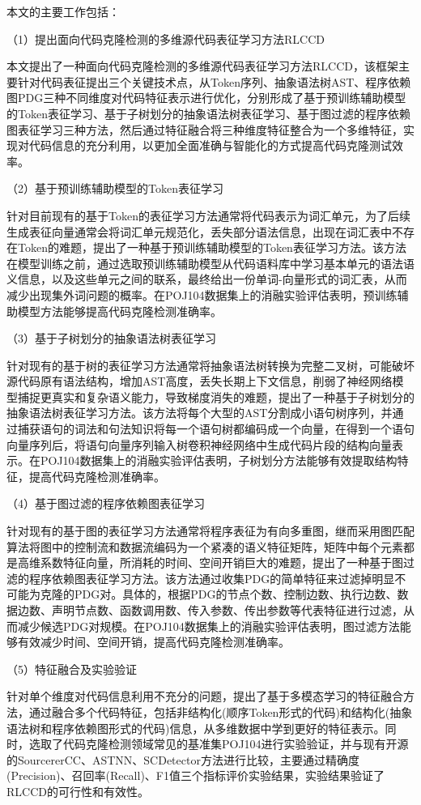 本文的主要工作包括：

（1）提出面向代码克隆检测的多维源代码表征学习方法RLCCD 

本文提出了一种面向代码克隆检测的多维源代码表征学习方法RLCCD，该框架主要针对代码表征提出三个关键技术点，从Token序列、抽象语法树AST、程序依赖图PDG三种不同维度对代码特征表示进行优化，分别形成了基于预训练辅助模型的Token表征学习、基于子树划分的抽象语法树表征学习、基于图过滤的程序依赖图表征学习三种方法，然后通过特征融合将三种维度特征整合为一个多维特征，实现对代码信息的充分利用，以更加全面准确与智能化的方式提高代码克隆测试效率。 

（2）基于预训练辅助模型的Token表征学习

针对目前现有的基于Token的表征学习方法通常将代码表示为词汇单元，为了后续生成表征向量通常会将词汇单元规范化，丢失部分语法信息，出现在词汇表中不存在Token的难题，提出了一种基于预训练辅助模型的Token表征学习方法。该方法在模型训练之前，通过选取预训练辅助模型从代码语料库中学习基本单元的语法语义信息，以及这些单元之间的联系，最终给出一份单词-向量形式的词汇表，从而减少出现集外词问题的概率。在POJ104数据集上的消融实验评估表明，预训练辅助模型方法能够提高代码克隆检测准确率。

（3）基于子树划分的抽象语法树表征学习

针对现有的基于树的表征学习方法通常将抽象语法树转换为完整二叉树，可能破坏源代码原有语法结构，增加AST高度，丢失长期上下文信息，削弱了神经网络模型捕捉更真实和复杂语义能力，导致梯度消失的难题，提出了一种基于子树划分的抽象语法树表征学习方法。该方法将每个大型的AST分割成小语句树序列，并通过捕获语句的词法和句法知识将每一个语句树都编码成一个向量，在得到一个语句向量序列后，将语句向量序列输入树卷积神经网络中生成代码片段的结构向量表示。在POJ104数据集上的消融实验评估表明，子树划分方法能够有效提取结构特征，提高代码克隆检测准确率。

（4）基于图过滤的程序依赖图表征学习

针对现有的基于图的表征学习方法通常将程序表征为有向多重图，继而采用图匹配算法将图中的控制流和数据流编码为一个紧凑的语义特征矩阵，矩阵中每个元素都是高维系数特征向量，所消耗的时间、空间开销巨大的难题，提出了一种基于图过滤的程序依赖图表征学习方法。该方法通过收集PDG的简单特征来过滤掉明显不可能为克隆的PDG对。具体的，根据PDG的节点个数、控制边数、执行边数、数据边数、声明节点数、函数调用数、传入参数、传出参数等代表特征进行过滤，从而减少候选PDG对规模。在POJ104数据集上的消融实验评估表明，图过滤方法能够有效减少时间、空间开销，提高代码克隆检测准确率。

（5）特征融合及实验验证

针对单个维度对代码信息利用不充分的问题，提出了基于多模态学习的特征融合方法，通过融合多个代码特征，包括非结构化(顺序Token形式的代码)和结构化(抽象语法树和程序依赖图形式的代码)信息，从多维数据中学到更好的特征表示。同时，选取了代码克隆检测领域常见的基准集POJ104进行实验验证，并与现有开源的SourcererCC\cite{7886988}、ASTNN\cite{8812062}、SCDetector\cite{10.1145/3324884.3416562}方法进行比较，主要通过精确度(Precision)、召回率(Recall)、F1值三个指标评价实验结果，实验结果验证了RLCCD的可行性和有效性。

